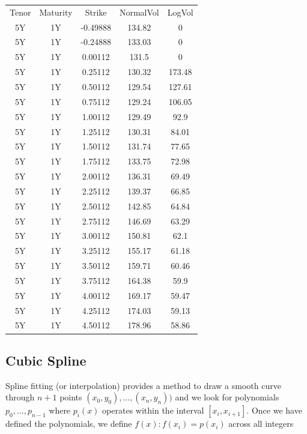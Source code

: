 \documentclass[11pt]{article}
\begin{document}
\begin{table}[ht]
	\centering
	\begin{tabular}{c|c|c|c|c}
	Tenor & Maturity & Strike & NormalVol & LogVol \\ [1ex]
	5Y & 1Y & -0.49888 & 134.82 & 0 \\ [1ex]
	5Y & 1Y & -0.24888 & 133.03 & 0 \\ [1ex]
	5Y & 1Y & 0.00112 & 131.5 & 0 \\ [1ex]
	5Y & 1Y & 0.25112 & 130.32 & 173.48 \\ [1ex]
	5Y & 1Y & 0.50112 & 129.54 & 127.61 \\ [1ex]
	5Y & 1Y & 0.75112 & 129.24 & 106.05 \\ [1ex]
	5Y & 1Y & 1.00112 & 129.49 & 92.9 \\ [1ex]
	5Y & 1Y & 1.25112 & 130.31 & 84.01 \\ [1ex]
	5Y & 1Y & 1.50112 & 131.74 & 77.65 \\ [1ex]
	5Y & 1Y & 1.75112 & 133.75 & 72.98 \\ [1ex]
	5Y & 1Y & 2.00112 & 136.31 & 69.49 \\ [1ex]
	5Y & 1Y & 2.25112 & 139.37 & 66.85 \\ [1ex]
	5Y & 1Y & 2.50112 & 142.85 & 64.84 \\ [1ex]
	5Y & 1Y & 2.75112 & 146.69 & 63.29 \\ [1ex]
	5Y & 1Y & 3.00112 & 150.81 & 62.1 \\ [1ex]
	5Y & 1Y & 3.25112 & 155.17 & 61.18 \\ [1ex]
	5Y & 1Y & 3.50112 & 159.71 & 60.46 \\ [1ex]
	5Y & 1Y & 3.75112 & 164.38 & 59.9 \\ [1ex]
	5Y & 1Y & 4.00112 & 169.17 & 59.47 \\ [1ex]
	5Y & 1Y & 4.25112 & 174.03 & 59.13 \\ [1ex]
	5Y & 1Y & 4.50112 & 178.96 & 58.86 \\ [1ex]
	\end{tabular}
	\label{tab:ice_data}
\end{table}

\subsection{Cubic Spline}

Spline fitting (or interpolation) provides a method to draw a smooth curve through $n+1$ points $(x_0,y_0), \dots ,(x_n,y_n))$ and we look for polynomials $p_0, \dots ,p_{n-1}$ where $p_i(x)$ operates within the interval $[x_i,x_{i+1}]$.  Once we have defined the polynomials, we define $f(x): f(x_i)=p(x_i)$ across all integers \par
\end{document}

